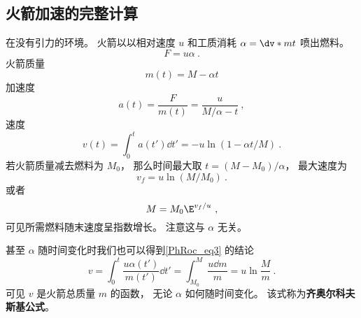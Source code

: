 \subsection{火箭加速的完整计算}
在没有引力的环境。 火箭以以相对速度 $u$ 和工质消耗 $\alpha = \dv*{m}{t}$  喷出燃料。
\begin{equation}
F = u\alpha~.
\end{equation}
火箭质量
\begin{equation}
m(t) = M - \alpha t
\end{equation}
加速度
\begin{equation}
a(t) = \frac{F}{m(t)} = \frac{u}{M/\alpha - t}~,
\end{equation}
速度
\begin{equation}
v(t) = \int_0^t a(t') \dd{t'} = -u \ln(1 - \alpha t / M)~.
\end{equation}
若火箭质量减去燃料为 $M_0$， 那么时间最大取 $t = (M - M_0)/\alpha$， 最大速度为
\begin{equation}
v_f = u \ln(M / M_0)~.
\end{equation}
或者
\begin{equation}\label{PhRoc_eq3}
M = M_0\E^{v_f/u}~,
\end{equation}
可见所需燃料随末速度呈指数增长。 注意这与 $\alpha$ 无关。

甚至 $\alpha$ 随时间变化时我们也可以得到\autoref{PhRoc_eq3} 的结论
\begin{equation}
v = \int_0^t \frac{u\alpha(t')}{m(t')}\dd{t'} = \int_{M_0}^M \frac{u\dd{m}}{m} = u\ln{\frac{M}{m}}~.
\end{equation}
可见 $v$ 是火箭总质量 $m$ 的函数， 无论 $\alpha$ 如何随时间变化。 该式称为\textbf{齐奥尔科夫斯基公式}。
